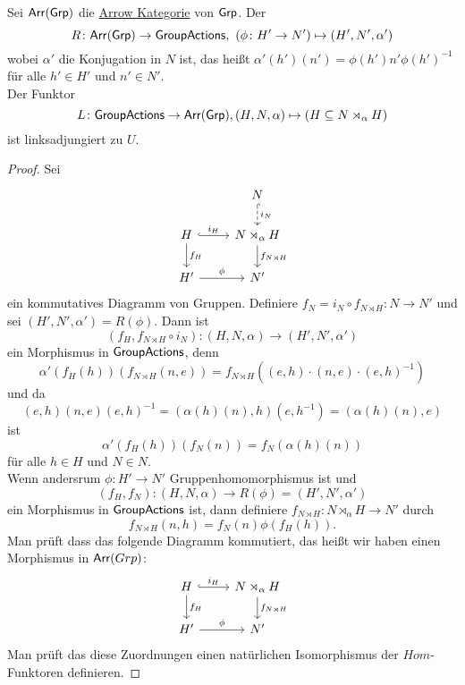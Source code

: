 \begin{Lemma}\label{Lem:AdjSemDir}
    Sei $\mathsf{Arr}(\mathsf{Grp})$ die \hyperref[Def:ArrowCat]{Arrow Kategorie} von $\mathsf{Grp}$. Der 
    $$R\colon \mathsf{Arr}(\mathsf{Grp})\to\mathsf{GroupActions},\ (\phi\colon H'\to N')\mapsto (H',N',\alpha')$$ wobei $\alpha'$ die Konjugation in $N$ ist, das heißt $\alpha'(h')(n')=\phi(h')n'\phi(h')^{-1}$ für alle $h'\in H'$ und $n'\in N'$.\\
    Der Funktor $$L\colon\mathsf{GroupActions}\to\mathsf{Arr}(\mathsf{Grp}), (H,N,\alpha)\mapsto (H\subseteq N\rtimes_\alpha H)$$ ist linksadjungiert zu $U$.
\end{Lemma}
\begin{proof}
     Sei $$%
\begin{tikzcd}
                                          & N \arrow[d, "i_N", hook,dashed]                      \\
H \arrow[d, "f_H"] \arrow[r, "i_H", hook] & N\rtimes_\alpha H \arrow[d, "f_{N\rtimes H}"] \\
H' \arrow[r, "\phi"]                      & N'                                           
\end{tikzcd}$$ ein kommutatives Diagramm von Gruppen.
     Definiere $f_N=i_N\circ f_{N\rtimes H}\colon N\to N'$ und sei $(H',N',\alpha')=R(\phi)$.
     Dann ist $$(f_H,f_{N\rtimes H}\circ i_N)\colon (H,N,\alpha)\to (H',N',\alpha')$$ ein Morphismus in $\mathsf{GroupActions}$, denn
     $$\alpha'(f_H(h))(f_{N\rtimes H}(n,e))=f_{N\rtimes H}((e,h)\cdot (n,e)\cdot (e,h)^{-1})$$
      und da $$(e,h)(n,e)(e,h)^{-1}=(\alpha(h)(n),h)(e,h^{-1})=(\alpha(h)(n),e)$$
      ist $$\alpha'(f_H(h))(f_{N}(n))=f_N(\alpha(h)(n))$$ für alle $h\in H$ und $N\in N$.\\
      Wenn andersrum $\phi\colon H'\to N'$ Gruppenhomomorphismus ist und $$(f_H,f_N)\colon(H,N,\alpha)\to R(\phi)=(H',N',\alpha')$$ ein Morphismus in $\mathsf{GroupActions}$ ist, dann definiere $f_{N\rtimes H}\colon N\rtimes_\alpha H\to N'$ durch $$f_{N\rtimes H}(n,h)=f_N(n)\phi(f_H(h)).$$
      Man prüft dass das folgende Diagramm kommutiert, das heißt wir haben einen Morphismus in $\mathsf{Arr}(Grp)$:
      $$%
\begin{tikzcd}
H \arrow[d, "f_H"] \arrow[r, "i_H", hook] & N\rtimes_\alpha H \arrow[d, "f_{N\rtimes H}"] \\
H' \arrow[r, "\phi"]                      & N'                                           
\end{tikzcd}$$ Man prüft das diese Zuordnungen einen natürlichen Isomorphismus der $Hom$-Funktoren definieren.
      
     \end{proof}
